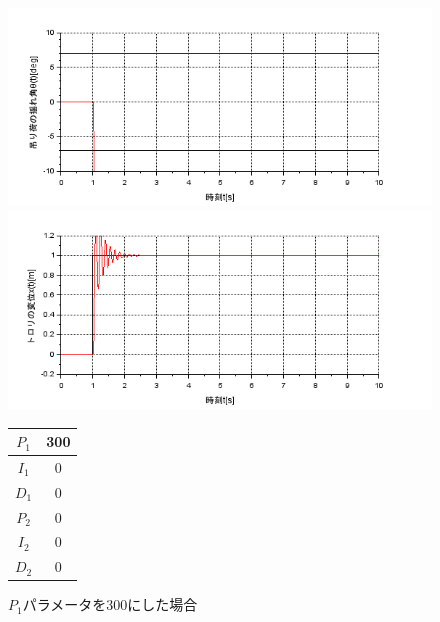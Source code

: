 \documentclass[dvipdfmx,titlepage,a4j]{jsarticle}  %
\begin{document}
\begin{figure}[H]
  \begin{minipage}{4.5cm}
    \centering
    \includegraphics[keepaspectratio, scale=0.35]{../graph/crane/ang-P1-300-I1-0-D1-0-P2-0-I2-0-D2-0.png}
  \end{minipage}
  \hfill
  \begin{minipage}{4.5cm}
    \centering
    \includegraphics[keepaspectratio, scale=0.35]{../graph/crane/po-P1-300-I1-0-D1-0-P2-0-I2-0-D2-0.png}
  \end{minipage}
  \hfill
  \begin{minipage}{3cm}
    \begin{center}
      \begin{tabular}{c|c}
        \hline
        $P_1$ & 300\\ \hline
        $I_1$ & 0\\ \hline
        $D_1$ & 0\\ \hline
        $P_2$ & 0\\ \hline
        $I_2$ & 0\\ \hline
        $D_2$ & 0\\
        \hline
      \end{tabular}
    \end{center}
  \end{minipage}
  \hfill
  \caption{$P_1$パラメータを300にした場合}
  \label{fig:crane:3}
\end{figure}
\end{document}
